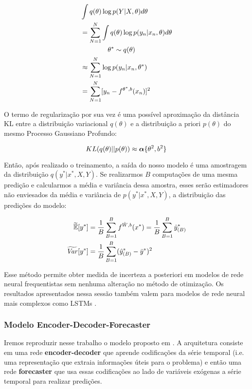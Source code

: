 \begin{align*}
                    &\int q(\theta) \log p(Y | X,\theta)d\theta \\ 
                    &=  \sum^N_{N=1} \int q(\theta) \log p(y_n | x_n,\theta)d\theta \\ 
                    &\qquad \qquad  \theta^* \sim q(\theta) \\
                    &\approx \sum^N_{N=1} \log p(y_n | x_n,\theta^*) \\
                    &= \sum^N_{N=1} [y_n - \mathnormal{f}^{\theta^*,b}(x_n)]^2
\end{align*}


O termo de regularização por sua vez é uma possível aproximação da distância KL
entre a distribuição variacional $q(\theta)$ e a distribuição a priori
$p(\theta)$ do mesmo Processo Gaussiano Profundo: 

\begin{equation}
    \mathnormal{KL}(q(\theta) ||p(\theta)) \approx \boldsymbol{\alpha}\{\theta^2,b^2\}
 \end{equation} 

Então, após realizado o treinamento, a saída do nosso modelo é uma amostragem da
distribuição $q(y^* | x^*,X,Y)$. Se realizarmos $B$ computações de uma mesma
predição e calcularmos a média e variância dessa amostra, esses serão
estimadores não enviesados da média e variância de $p(y^*|x^*,X,Y)$, a
distribuição das predições do modelo:


\begin{align*}
  \label{eq:aproxs}
  \widetilde{\mathbb{E}}[y^*] &=
   \frac{1}{B}\sum^B_{B=1}\mathnormal{f}^{\hat{W},b}(x^*) = \frac{1}{B}\sum^B_{B=1}\hat{y}^*_{(B)}\\ 
   \widetilde{\mathit{Var}}[y^*]  &= \frac{1}{B}\sum^B_{B=1}(\hat{y}^*_{(B)} - \bar{y}^*)^2 
 \end{align*}


Esse método permite obter medida de incerteza a posteriori em modelos de rede
neural frequentistas sem nenhuma alteração no método de otimização.
Os resultados apresentados nessa sessão também valem para modelos de rede neural
mais complexos como LSTMs \citep{dropbayes}.
 
\subsubsection{Modelo Encoder-Decoder-Forecaster}

Iremos reproduzir nesse trabalho o modelo proposto em \citep{ubertime}. A
arquitetura consiste em uma rede \textbf{encoder-decoder} que aprende codificações da
série temporal (i.e. uma representação que extraia informações úteis para o
problema) e então uma rede \textbf{forecaster} que usa essas codificações ao lado de
variáveis exógenas a série temporal para realizar predições.  


